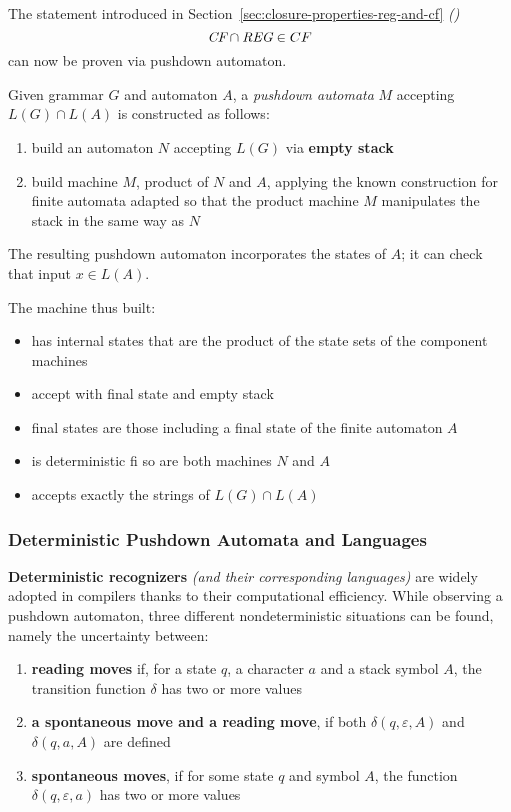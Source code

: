 \documentclass[english]{article}
\begin{document}
The statement introduced in Section~\ref{sec:closure-properties-reg-and-cf} \textit{()}
\[ \textit{CF} \cap \textit{REG} \in CF \]
can now be proven via pushdown automaton.

Given grammar \(G\) and automaton \(A\), a \textit{pushdown automata} \(M\) accepting \(L(G) \cap L(A)\) is constructed as follows:

\begin{enumerate}
  \item build an automaton \(N\) accepting \(L(G)\) via \textbf{empty stack}
  \item build machine \(M\), product of \(N\) and \(A\), applying the known construction for finite automata adapted so that the product machine \(M\) manipulates the stack in the same way as \(N\)
\end{enumerate}

The resulting pushdown automaton incorporates the states of \(A\);
it can check that input \(x \in L(A)\).

The machine thus built:

\begin{itemize}
  \item has internal states that are the product of the state sets of the component machines
  \item accept with final state and empty stack
  \item final states are those including a final state of the finite automaton \(A\)
  \item is deterministic fi so are both machines \(N\) and \(A\)
  \item accepts exactly the strings of \(L(G) \cap L(A)\)
\end{itemize}

\subsubsection{Deterministic Pushdown Automata and Languages}

\textbf{Deterministic recognizers} \textit{(and their corresponding languages)} are widely adopted in compilers thanks to their computational efficiency.
While observing a pushdown automaton, three different nondeterministic situations can be found, namely the uncertainty between:

\begin{enumerate}
  \item \textbf{reading moves} if, for a state \(q\), a character \(a\) and a stack symbol \(A\), the transition function \(\delta\) has two or more values
  \item \textbf{a spontaneous move and a reading move}, if both \(\delta(q, \varepsilon, A)\) and \(\delta(q, a, A)\) are defined
  \item \textbf{spontaneous moves}, if for some state \(q\) and symbol \(A\), the function \(\delta(q, \varepsilon, a)\) has two or more values
\end{enumerate}
\end{document}
